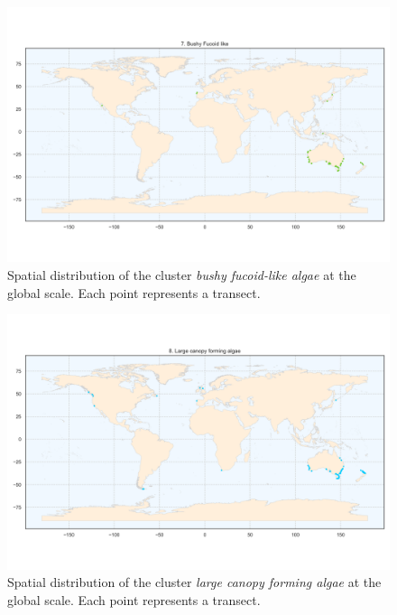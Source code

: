 \begin{figure}
\hypertarget{fig:chap2figS9}{%
\centering
\includegraphics{03-Chapitre2/figures/supplementary/06-spatial-cluster_distribution_cluster_6.png}
\caption{Spatial distribution of the cluster \emph{bushy fucoid-like
algae} at the global scale. Each point represents a
transect.}\label{fig:chap2figS9}
}
\end{figure}

\begin{figure}
\hypertarget{fig:chap2figS10}{%
\centering
\includegraphics{03-Chapitre2/figures/supplementary/06-spatial-cluster_distribution_cluster_7.png}
\caption{Spatial distribution of the cluster \emph{large canopy forming
algae} at the global scale. Each point represents a
transect.}\label{fig:chap2figS10}
}
\end{figure}

